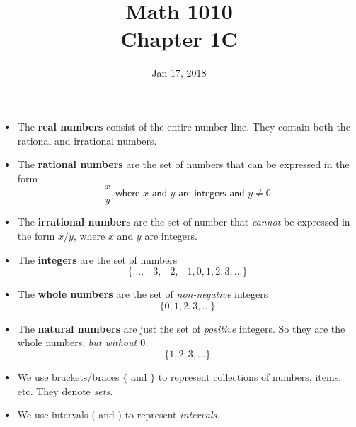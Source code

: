\documentclass[12pt]{article}
\begin{document}
\title{\bf Math 1010 \\ Chapter 1C}
\date{Jan 17, 2018}
\maketitle





\renewcommand{\theenumi}{\alph{enumi}}
\renewcommand{\labelenumi}{(\theenumi)}

\begin{itemize}
	\item The {\bf real numbers} consist of the entire number line.  They contain both the rational and irrational numbers.
	\item The {\bf rational numbers} are the set of numbers that can be expressed in the form
	\begin{equation*}
		\frac{x}{y}, \textsf{where $x$ and $y$ are integers and $y\neq 0$}
	\end{equation*}
	\item The {\bf irrational numbers} are the set of number that {\it cannot} be expressed in the form $x/y$, where $x$ and $y$ are integers.
	\item The {\bf integers} are the set of numbers
	\begin{equation*}
		\{\dots, -3, -2, -1, 0, 1, 2, 3, \dots\}
	\end{equation*}
	\item The {\bf whole numbers} are the set of {\it non-negative} integers
	\begin{equation*}
		\{0, 1, 2, 3, \dots\}
	\end{equation*}
	\item The {\bf natural numbers} are just the set of {\it positive} integers.  So they are the whole numbers, \emph{ but without $0$.}
	\begin{equation*}
		\{1, 2, 3, \dots\}
	\end{equation*} 
	\item We use brackets/braces $\lbrace$ and $\rbrace$ to represent collections of numbers, items, etc. They denote \emph{sets.}
	\item We use intervals $($ and $)$ to represent \emph{intervals.}
\end{itemize}
\end{document}
